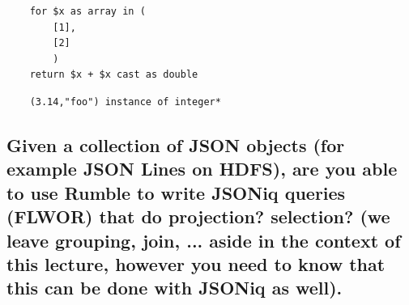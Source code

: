 \documentclass{article}
\begin{document}
\begin{verbatim}
    for $x as array in ( 
        [1],
        [2]
        )
    return $x + $x cast as double
\end{verbatim}

\begin{verbatim}
    (3.14,"foo") instance of integer*
\end{verbatim}

\subsection{Given a collection of JSON objects (for example JSON Lines on HDFS), are you able to use Rumble to write JSONiq queries (FLWOR) that do projection? selection? (we leave grouping, join, ... aside in the context of this lecture, however you need to know that this can be done with JSONiq as well).}



\end{document}
